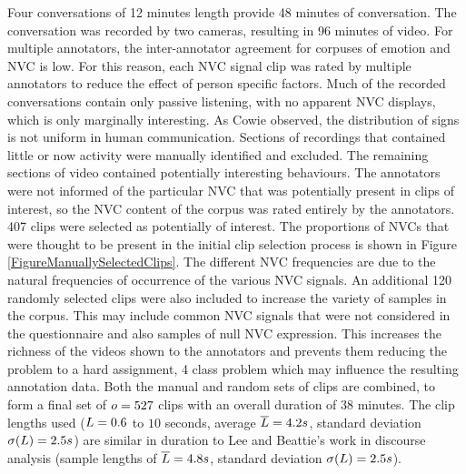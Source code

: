 Four conversations of 12 minutes length provide 48 minutes of conversation. The conversation was recorded by two cameras, resulting in 96 minutes of video. 
For multiple annotators, the inter-annotator agreement for corpuses of emotion \cite{Reidsma2008} and \ac{NVC} is low. For this reason, each \ac{NVC} signal clip was rated by multiple annotators to reduce the effect of person specific factors. Much of the recorded conversations contain only passive listening, with no apparent \ac{NVC} displays, which is only marginally interesting. As Cowie \etal \cite{Cowie2009} observed, the distribution of signs is not uniform in human communication. 
Sections of recordings that contained little or now activity were manually identified and excluded. The remaining sections of video contained potentially interesting behaviours. The annotators were not informed of the particular \ac{NVC} that was potentially present in clips of interest, so the \ac{NVC} content of the corpus was rated entirely by the annotators.
407 clips were selected as potentially of interest. The proportions of \ac{NVC}s that were thought to be present in the initial clip selection process is shown in Figure \ref{FigureManuallySelectedClips}. The different \ac{NVC} frequencies are due to the natural frequencies of occurrence of the various \ac{NVC} signals. An additional 120 randomly selected clips were also included to increase the variety of samples in the corpus. This may include common \ac{NVC} signals that were not considered in the questionnaire and also samples of null \ac{NVC} expression. This increases the richness of the videos shown to the annotators and prevents them reducing the problem to a hard assignment, 4 class problem which may influence the resulting annotation data. Both the manual and random sets of clips are combined, to form a final set of $o=527$ clips with an overall duration of 38 minutes. The clip lengths used ($L=0.6$ to $10$ seconds, average $\overline{L}=4.2s$, standard deviation $\sigma(L)=2.5s$) are similar in duration to Lee and Beattie's work in discourse analysis \cite{Lee1998} (sample lengths of $\overline{L}=4.8s$, standard deviation $\sigma(L)=2.5s$). 

